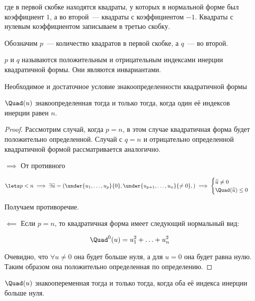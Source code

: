 где в первой скобке находятся квадраты, у которых в нормальной форме был
коэффициент \(1\), а во второй~--- квадраты с коэффициентом \(-1\). Квадраты с
нулевым коэффициентом записываем в третью скобку.

Обозначим \(p\)~--- количество квадратов в первой скобке, а \(q\)~--- во второй.

\begin{definition}
  \(p\) и \(q\) называются положительным и отрицательным индексами инерции
  квадратичной формы. Они являются инвариантами.
\end{definition}

\begin{theorem}\label{quad-sd}
  Необходимое и достаточное условие знакоопределенности квадратичной формы

  \(\Quad(u)\) знакоопределенная тогда и только тогда, когда один её индексов
  инерции равен \(n\).
\end{theorem}
\begin{proof}
  Рассмотрим случай, когда \(p = n\), в этом случае квадратичная форма будет
  положительно определенной. Случай с \(q = n\) и отрицательно определенной
  квадратичной формой рассматривается аналогично.

  \(\implies\) От противного

  \begin{align*}
    \lets p < n
    \implies
    \exists \widehat{u} = (
      \under{u_{1}, \dotsc, u_{p}}{0},
      \under{u_{p + 1}, \dotsc, u_{n}}{\neq 0},
    )
    \implies
    \begin{cases}
      \widehat{u} \neq 0 \\
      \Quad(\widehat{u}) \le 0
    \end{cases}
  \end{align*}

  Получаем противоречие.

  \(\impliedby\) Если \(p = n\), то квадратичная форма имеет следующий
  нормальный вид:
  
  \begin{align*}
    \Quad^{0}(u) = u_{1}^2 + \dotsc + u_{n}^2
  \end{align*}

  Очевидно, что \(\forall u \neq 0\) она будет больше нуля, а для
  \(u = 0\) она будет равна нулю. Таким образом она положительно определенная по
  определению.
\end{proof}

\begin{theorem}\label{quad-sc}
  \(\Quad(u)\) знакоопеременная тогда и только тогда, когда оба её индекса
  инерции больше нуля.
\end{theorem}


